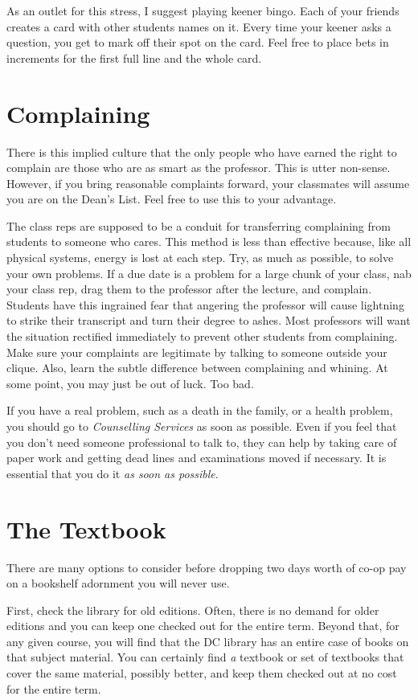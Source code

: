 \documentclass{book}
\begin{document}
As an outlet for this stress, I suggest playing keener bingo. Each of your friends creates a card with other students names on it. Every time your keener asks a question, you get to mark off their spot on the card. Feel free to place bets in increments for the first full line and the whole card.

\section{Complaining}
There is this implied culture that the only people who have earned the right to complain are those who are as smart as the professor. This is utter non-sense. However, if you bring reasonable complaints forward, your classmates will assume you are on the Dean's List. Feel free to use this to your advantage.

The class reps are supposed to be a conduit for transferring complaining from students to someone who cares. This method is less than effective because, like all physical systems, energy is lost at each step. Try, as much as possible, to solve your own problems. If a due date is a problem for a large chunk of your class, nab your class rep, drag them to the professor after the lecture, and complain. Students have this ingrained fear that angering the professor will cause lightning to strike their transcript and turn their degree to ashes. Most professors will want the situation rectified immediately to prevent other students from complaining. Make sure your complaints are legitimate by talking to someone outside your clique. Also, learn the subtle difference between complaining and whining. At some point, you may just be out of luck. Too bad.

If you have a real problem, such as a death in the family, or a health problem, you should go to \textsl{Counselling Services} as soon as possible. Even if you feel that you don't need someone professional to talk to, they can help by taking care of paper work and getting dead lines and examinations moved if necessary. It is essential that you do it \emph{as soon as possible}.

\section{The Textbook}
There are many options to consider before dropping two days worth of co-op pay on a bookshelf adornment you will never use.

First, check the library for old editions. Often, there is no demand for older editions and you can keep one checked out for the entire term. Beyond that, for any given course, you will find that the DC library has an entire case of books on that subject material. You can certainly find \emph{a} textbook or set of textbooks that cover the same material, possibly better, and keep them checked out at no cost for the entire term.
\end{document}
